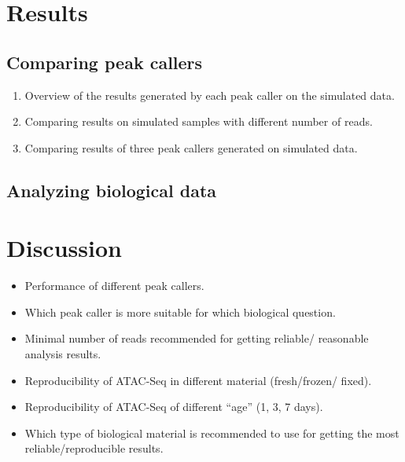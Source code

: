 \documentclass[11pt]{article}
\begin{document}
\section{Results}

\subsection{Comparing peak callers}
\begin{enumerate}
\itemsep0em
  \item Overview of the results generated by each peak caller on the 
        simulated data.
  \item Comparing results on simulated samples with different number of 
        reads.
  \item Comparing results of three peak callers generated on simulated 
        data.
\end{enumerate}

\subsection{Analyzing biological data}

\section{Discussion}
\begin{itemize}
\itemsep0em
  \item Performance of different peak callers.
  \item Which peak caller is more suitable for which biological question.
  \item Minimal number of reads recommended for getting reliable/
        reasonable analysis results.
  \item Reproducibility of ATAC-Seq in different material (fresh/frozen/
        fixed).
  \item Reproducibility of ATAC-Seq of different ``age'' (1, 3, 7 days).
  \item Which type of biological material is recommended to use for
        getting the most reliable/reproducible results.	
\end{itemize}
\end{document}
